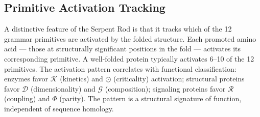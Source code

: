 \documentclass[11pt,a4paper,twocolumn]{article}
\begin{document}
\subsection{Primitive Activation Tracking}

A distinctive feature of the Serpent Rod is that it tracks which of the 12 grammar primitives are activated by the folded structure. Each promoted amino acid — those at structurally significant positions in the fold — activates its corresponding primitive. A well-folded protein typically activates 6--10 of the 12 primitives. The activation pattern correlates with functional classification: enzymes favor $\mathcal{K}$ (kinetics) and $\odot$ (criticality) activation; structural proteins favor $\mathcal{D}$ (dimensionality) and $\mathcal{G}$ (composition); signaling proteins favor $\mathcal{R}$ (coupling) and $\Phi$ (parity). The pattern is a structural signature of function, independent of sequence homology.
\end{document}
